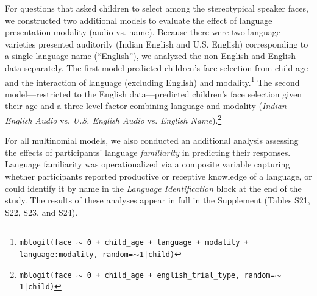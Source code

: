 \documentclass{foushee-adapted-preprint}
\newcommand{\geofamtab}{S21}
\newcommand{\relfamtab}{S22}
\newcommand{\faceaudiofamtab}{S23}
\newcommand{\facelabelfamtab}{S24}
\begin{document}
For questions that asked children to select among the stereotypical speaker faces, we constructed two additional models to evaluate the effect of language presentation modality (audio vs. name). 
Because there were two language varieties presented auditorily (Indian English and U.S. English) corresponding to a single language name (``English''), we analyzed the non-English and English data separately. 
The first model predicted children's face selection from child age and the interaction of language (excluding English) and modality.\footnote{\texttt{mblogit(face $\sim$ 0 + child\_age + language + modality + language:modality, random=$\sim$1|child)}}  
The second model---restricted to the English data---predicted children's face selection given their age and a three-level factor combining language and modality (\textit{Indian English Audio} vs. \textit{U.S. English Audio} vs. \textit{English Name}).\footnote{\texttt{mblogit(face $\sim$ 0 + child\_age + english\_trial\_type, random=$\sim$1|child)}} 

For all multinomial models, we also conducted an additional analysis assessing the effects of participants' language \textit{familiarity} in predicting their responses. 
Language familiarity was operationalized via a composite variable capturing whether participants reported productive or receptive knowledge of a language, or could identify it by name in the \textit{Language Identification} block at the end of the study.  %
The results of these analyses appear in full in the Supplement (Tables \geofamtab, \relfamtab, \faceaudiofamtab, and \facelabelfamtab). 

 
\end{document}
